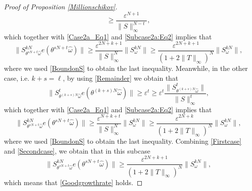 \documentclass[10pt,a4paper]{amsart}
\newcommand{\eps}{\varepsilon}
\begin{document}
\begin{proof}[Proof of Proposition \ref{Millionschikov}]
\[\geq\frac{\eps^{N+1}}{\|S\|_{\infty}^{N-t}},
\]
which together with \eqref{Case2a_Eq1} and \eqref{Subcase2a:Eq2} implies that 
\begin{equation}\label{Firstcase}
\|S^{kN}_{\theta^{sN+t}\widehat\omega}e(\theta^{sN+t}\widehat\omega)\|
\geq \frac{\eps^{2N+k+1}}{\|S\|_{\infty}^N}\|S^{kN}_{\omega}\|
\geq 
\frac{\eps^{2N+k+1}}{(1+2\|T\|_{\infty})^N}\|S^{kN}_{\omega}\|,
\end{equation}
where we used \eqref{BoundonS} to obtain the last inequality. Meanwhile, in the other case, i.e. $k+s=\ell$, by using \eqref{Remainder} we obtain that 
\[
\|S^{t}_{\theta^{(k+s)N}\widehat\omega}e(\theta^{(k+s)N}\widehat\omega)\|
\geq 
\eps^t
\geq 
\eps^t\frac{\|S^{t}_{\theta^{(k+s)N}\widehat\omega}\|}{\|S\|_{\infty}^{t}},
\]
which together with \eqref{Case2a_Eq1} and \eqref{Subcase2a:Eq2} implies that 
\begin{equation}\label{Secondcase}
\|S^{kN}_{\theta^{sN+t}\widehat\omega}e(\theta^{sN+t}\widehat\omega)\|
\geq \frac{\eps^{N+k+t}}{\|S\|_{\infty}^N}\|S^{kN}_{\omega}\|
\geq 
\frac{\eps^{2N+k}}{(1+2\|T\|_{\infty})^N}\|S^{kN}_{\omega}\|,
\end{equation}
where we used \eqref{BoundonS} to obtain the last inequality. Combining \eqref{Firstcase} and \eqref{Secondcase}, we obtain that in this subcase 
\[
\|S^{kN}_{\theta^{sN+t}\widehat\omega}e(\theta^{sN+t}\widehat\omega)\|
\geq 
\frac{\eps^{2N+k+1}}{(1+2\|T\|_{\infty})^N}\|S^{kN}_{\omega}\|,
\]
which means that  \eqref{Goodgrowthrate} holds. 


\end{proof}
\end{document}
